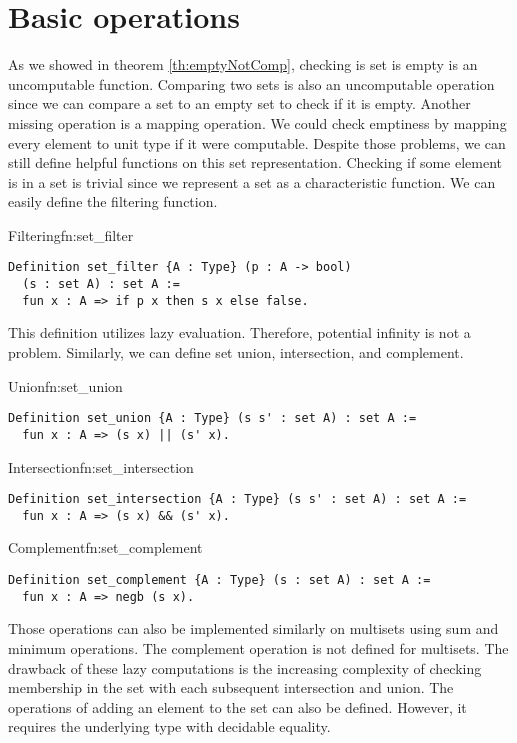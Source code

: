 \section{Basic operations}
As we showed in theorem \ref{th:emptyNotComp}, checking is set is empty is an uncomputable function. Comparing two sets is also an uncomputable operation since we can compare a set to an empty set to check if it is empty. Another missing operation is a mapping operation. We could check emptiness by mapping every element to unit type if it were computable. Despite those problems, we can still define helpful functions on this set representation. Checking if some element is in a set is trivial since we represent a set as a characteristic function. We can easily define the filtering function.
\begin{func}{Filtering}{fn:set_filter}
\begin{verbatim}
Definition set_filter {A : Type} (p : A -> bool) 
  (s : set A) : set A :=
  fun x : A => if p x then s x else false.
\end{verbatim}
\end{func}
This definition utilizes lazy evaluation. Therefore, potential infinity is not a problem. Similarly, we can define set union, intersection, and complement.
\begin{func}{Union}{fn:set_union}
\begin{verbatim}
Definition set_union {A : Type} (s s' : set A) : set A :=
  fun x : A => (s x) || (s' x).
\end{verbatim}
\end{func}
\begin{func}{Intersection}{fn:set_intersection}
\begin{verbatim}
Definition set_intersection {A : Type} (s s' : set A) : set A :=
  fun x : A => (s x) && (s' x).
\end{verbatim}
\end{func}
\begin{func}{Complement}{fn:set_complement}
\begin{verbatim}
Definition set_complement {A : Type} (s : set A) : set A :=
  fun x : A => negb (s x).
\end{verbatim}
\end{func}
Those operations can also be implemented similarly on multisets using sum and minimum operations. The complement operation is not defined for multisets. The drawback of these lazy computations is the increasing complexity of checking membership in the set with each subsequent intersection and union. The operations of adding an element to the set can also be defined. However, it requires the underlying type with decidable equality.
